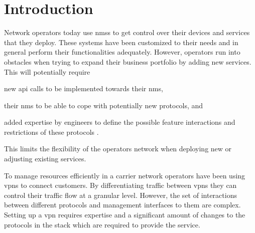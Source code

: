 \section{Introduction} %
\label{sec:introduction}
Network operators today use \acp{nms} to get control over their devices and services that they deploy. These systems have been customized to their needs and in general perform their functionalities adequately. However, operators run into obstacles when trying to expand their business portfolio by adding new services. This will potentially require
\begin{inparaenum}
	\item new \ac{api} calls to be implemented towards their \ac{nms}, 
	\item their \ac{nms} to be able to cope with potentially new protocols, and
	\item added expertise by engineers to define the possible feature interactions and restrictions of these protocols \cite{programmability-answer}. 
\end{inparaenum}
This limits the flexibility of the operators network when deploying new or adjusting existing services.



To manage resources efficiently in a carrier network operators have been using \acp{vpn} to connect customers. By differentiating traffic between \acp{vpn} they can control their traffic flow at a granular level. However, the set of interactions between different protocols and management interfaces to them are complex. Setting up a \ac{vpn} requires expertise and a significant amount of changes to the protocols in the stack which are required to provide the service. 


